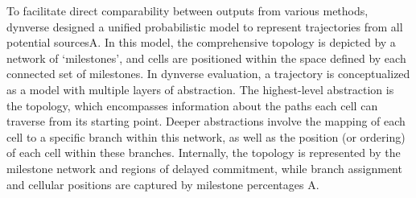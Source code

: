 To facilitate direct comparability between outputs from various methods, dynverse\citep{saelens2019comparison} designed a unified probabilistic model to represent trajectories from all potential sourcesA. In this model, the comprehensive topology is depicted by a network of `milestones', and cells are positioned within the space defined by each connected set of milestones. In dynverse evaluation, a trajectory is conceptualized as a model with multiple layers of abstraction. The highest-level abstraction is the topology, which encompasses information about the paths each cell can traverse from its starting point. Deeper abstractions involve the mapping of each cell to a specific branch within this network, as well as the position (or ordering) of each cell within these branches. Internally, the topology is represented by the milestone network and regions of delayed commitment, while branch assignment and cellular positions are captured by milestone percentages A.

